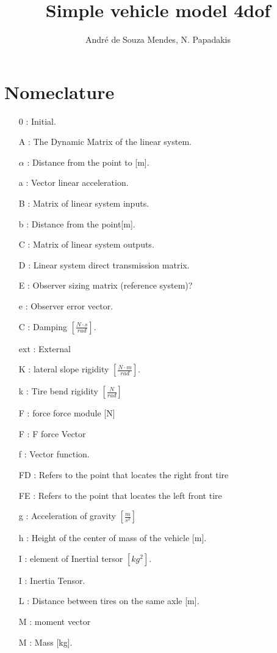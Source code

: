 \documentclass[sublist,a4paper,twoside,11pt]{article}
\author{André de Souza Mendes, N. Papadakis}
\title{Simple vehicle model 4dof }
\begin{document}
\maketitle
\tableofcontents
\section*{Nomeclature}

\begin{itemize}
\item [0]: Initial.
\item [A]: The Dynamic Matrix of the linear system.
\item [$\alpha$]: Distance from the point to [m].
\item [a]: Vector linear acceleration.
\item [B]: Matrix of linear system inputs.
\item [b]: Distance from the point[m].
\item [C]: Matrix of linear system outputs.
\item [D]: Linear system direct transmission matrix.
\item [E]: Observer sizing matrix (reference system)?
\item [e]: Observer error vector.
\item [C]: Damping $\left[\frac{N\cdot s}{rad}\right]$.
\item [ext]: External
\item [K]: lateral slope rigidity $\left[\frac{N\cdot m}{rad}\right]$.
\item [k]: Tire bend rigidity $\left[\frac{N}{rad}\right]$
\item [F]: force force module [N]
\item [F]: F force Vector
\item [f ]: Vector function.
\item [FD]: Refers to the point that locates the right front tire
\item [FE]: Refers to the point that locates the left front tire
\item [g]: Acceleration of gravity $[\frac{m}{s^2}]$
\item [h]: Height of the center of mass of the vehicle [m].
\item [I]: element of Inertial tersor $[kg^2]$.
\item [I]: Inertia Tensor.
\item [L]: Distance between tires on the same axle [m].
\item [M]: moment vector 
\item [M]: Mass [kg].

\end{itemize}
\end{document}
